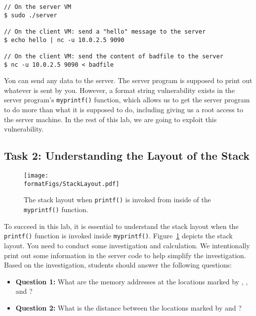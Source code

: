 \begin{lstlisting}
// On the server VM
$ sudo ./server

// On the client VM: send a "hello" message to the server
$ echo hello | nc -u 10.0.2.5 9090

// On the client VM: send the content of badfile to the server
$ nc -u 10.0.2.5 9090 < badfile
\end{lstlisting}

Yon can send any data to the server. The server program is supposed
to print out whatever is sent by you. However, 
a format string vulnerability exists in the server program's
\texttt{myprintf()} function, which allows us to get the server program to
do more than what it is supposed to do, including giving us a root access to the
server machine. In the rest of this lab, we are going to
exploit this vulnerability.
 

\subsection{Task 2: Understanding the Layout of the Stack}


\begin{figure}[htb]
\begin{center}
\texttt{[image: \\formatFigs/StackLayout.pdf]}
\end{center}
\caption{The stack layout when \texttt{printf()} is invoked 
from inside of the \texttt{myprintf()} function.}
\label{format:fig:stacklayout}
\end{figure}
 


To succeed in this lab, it is essential to understand the stack layout when
the \texttt{printf()} function is invoked inside \texttt{myprintf()}. 
Figure~\ref{format:fig:stacklayout} depicts the stack layout. 
You need to conduct some investigation and calculation. 
We intentionally print out some information in the server code to
help simplify the investigation. Based on the investigation,
students should answer the following questions: 

\begin{itemize} 
\item \textbf{Question 1:}  What are the memory addresses at the locations marked by
, , and ?

\item \textbf{Question 2:} What is the distance between the locations marked
by  and ?
\end{itemize} 

